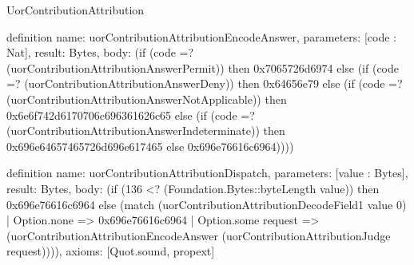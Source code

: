 \begin{lexlean}{UorContributionAttribution}
\begin{semanticmodule}
definition{
  name: uorContributionAttributionEncodeAnswer,
  parameters: [code : Nat],
  result: Bytes,
  body: (if (code =? (uorContributionAttributionAnswerPermit)) then 0x7065726d6974 else (if (code =? (uorContributionAttributionAnswerDeny)) then 0x64656e79 else (if (code =? (uorContributionAttributionAnswerNotApplicable)) then 0x6e6f742d6170706c696361626c65 else (if (code =? (uorContributionAttributionAnswerIndeterminate)) then 0x696e64657465726d696e617465 else 0x696e76616c6964))))
}

definition{
  name: uorContributionAttributionDispatch,
  parameters: [value : Bytes],
  result: Bytes,
  body: (if (136 <? (Foundation.Bytes::byteLength value)) then 0x696e76616c6964 else (match (uorContributionAttributionDecodeField1 value 0)
    | Option.none => 0x696e76616c6964
    | Option.some request => (uorContributionAttributionEncodeAnswer (uorContributionAttributionJudge request)))),
  axioms: [Quot.sound, propext]
}
\end{semanticmodule}
\end{lexlean}
